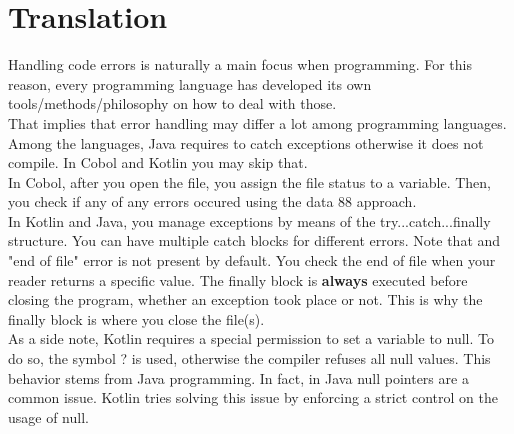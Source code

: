 \documentclass[letterpaper,12pt]{article}
\begin{document}
\section{Translation}
Handling code errors is naturally a main focus when programming. For this reason, every programming language has developed its own tools/methods/philosophy on how to deal with those.\\
That implies that error handling may differ a lot among programming languages. Among the languages, Java requires to catch exceptions otherwise it does not compile.
In Cobol and Kotlin you may skip that.\\
In Cobol, after you open the file, you assign the file status to a variable. Then, you check if any of any errors occured using the data 88 approach.\\
In Kotlin and Java, you manage exceptions by means of the try...catch...finally structure. You can have multiple catch blocks for different errors. 
Note that and "end of file" error is not present by default. You check the end of file when your reader returns a specific value. 
The finally block is \textbf{always} executed before closing the program, whether an exception took place or not. This is why the finally block is where you close the file(s).\\
As a side note, Kotlin requires a special permission to set a variable to null. To do so, the symbol ? is used, otherwise the compiler refuses all null values. This 
behavior stems from Java programming. In fact, in Java null pointers are a common issue. Kotlin tries solving this issue by enforcing a strict control on the usage of null.
\end{document}
